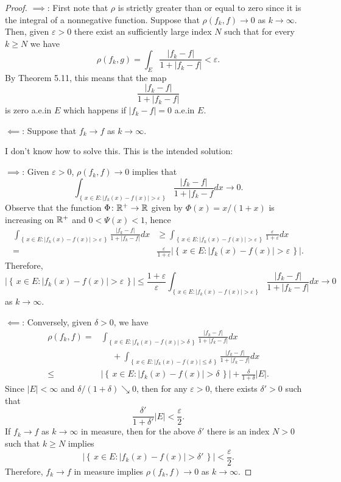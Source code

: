\begin{proof}
$\implies$: First note that $\rho$ is strictly greater than or equal to
zero since it is the integral of a nonnegative function. Suppose that
$\rho(f_k,f)\to 0$ as $k\to\infty$. Then, given $\varepsilon>0$ there exist
an sufficiently large index $N$ such that for every $k\geq N$ we have
\begin{equation}
\label{eq:hypothesis-4}
\rho(f_k,g)=\int_E\frac{|f_k-f|}{1+|f_k-f|}<\varepsilon.
\end{equation}
By Theorem 5.11, this means that the map
\[
\frac{|f_k-f|}{1+|f_k-f|}
\]
is zero a.e.\@ in $E$ which happens if $|f_k-f|=0$ a.e.\@ in $E$.

$\impliedby$: Suppose that $f_k\to f$ as $k\to\infty$.

\bigskip

I don't know how to solve this. This is the intended solution:

$\implies$: Given $\varepsilon>0$, $\rho(f_k,f)\to 0$ implies that
\[
\int_{\left\{\,x\in
    E:|f_k(x)-f(x)|>\varepsilon\,\right\}}\frac{|f_k-f|}{1+|f_k-f} d
x\longrightarrow 0.
\]
Observe that the function $\Phi\colon\mathbb{R}^+\to\mathbb{R}$ given by
$\Phi(x)= x/(1+x)$ is increasing on $\mathbb{R}^+$ and $0<\Psi(x)<1$,
hence
\[
\begin{aligned}
  \int_{\left\{\,x\in
      E:|f_k(x)-f(x)|>\varepsilon\,\right\}}\frac{|f_k-f|}{1+|f_k-f|} d
  x
&\geq\int_{\left\{\,x\in
    E:|f_k(x)-f(x)|>\varepsilon\,\right\}}\frac{\varepsilon}{1+\varepsilon} d
x\\
={}&\frac{\varepsilon}{1+\varepsilon}
\left|\left\{\,x\in E:|f_k(x)-f(x)|>\varepsilon\,\right\}\right|.
\end{aligned}
\]
Therefore,
\[
\left|\left\{\,x\in E:|f_k(x)-f(x)|>\varepsilon\,\right\}\right|
\leq\frac{1+\varepsilon}{\varepsilon}
\int_{\left\{\,x\in
    E:|f_k(x)-f(x)|>\varepsilon\,\right\}}\frac{|f_k-f|}{1+|f_k-f|} d  x
\longrightarrow 0
\]
as $k\to\infty$.

$\impliedby$: Conversely, given $\delta>0$, we have
\[
\begin{aligned}
\rho(f_k,f)
={}&\int_{\left\{\,x\in E:|f_k(x)-f(x)|>\delta\,\right\}}\frac{|f_k-f|}{1+|f_k-f|} d  x\\
&\phantom{{}={}}+\int_{\left\{\,x\in
    E:|f_k(x)-f(x)|\leq\delta\,\right\}}\frac{|f_k-f|}{1+|f_k-f|} d  x\\
\leq{}&\left|\left\{\,x\in
    E:|f_k(x)-f(x)|>\delta\,\right\}\right|+\frac{\delta}{1+\delta}|E|.
\end{aligned}
\]
Since $|E|<\infty$ and $\delta/(1+\delta)\searrow 0$, then for any
$\varepsilon>0$, there exists $\delta'>0$ such that
\[
\frac{\delta'}{1+\delta'}|E|<\frac{\varepsilon}{2}.
\]
If $f_k\to f$ as $k\to\infty$ in measure, then for the above $\delta'$
there is an index $N>0$ such that $k\geq N$ implies
\[
\left|\left\{\,x\in E:|f_k(x)-f(x)|>\delta'\,\right\}\right|<\frac{\varepsilon}{2}.
\]
Therefore, $f_k\to f$ in measure implies $\rho(f_k,f)\to 0$ as $k\to\infty$.
\end{proof}

